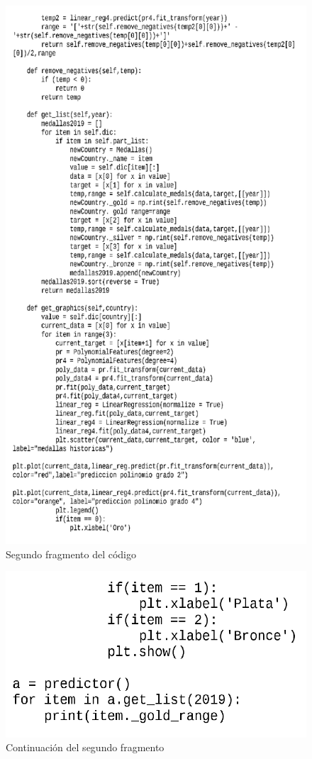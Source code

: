 \documentclass[a4paper,12pt]{article}
\begin{document}
\begin{figure}[hbtp]
\caption{Segundo fragmento del c\'{o}digo}
\includegraphics[scale=0.7]{second_part.png}
\end{figure}
\newpage
\begin{figure}[hbtp]
\caption{Continuaci\'{o}n del segundo fragmento}
\centering
\includegraphics[scale=0.4]{third.png}
\end{figure}
\end{document}
